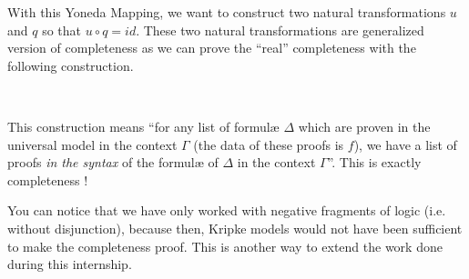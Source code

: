 \documentclass[10pt,a4paper]{article}
\begin{document}
			With this Yoneda Mapping, we want to construct two natural transformations $u$ and $q$ so that $u \circ q = id$. These two natural transformations are generalized version of completeness as we can prove the \enquote{real} completeness with the following construction.
			
			\begin{center}
			\begin{code}
				\>[4]\AgdaSpace{}%
				\AgdaSymbol{:}\AgdaSpace{}%
				\AgdaSymbol{\{}\AgdaSpace{}%
				\AgdaSpace{}%
				\AgdaSymbol{:}\AgdaSpace{}%
				\AgdaSymbol{\}}\AgdaSpace{}%
				\AgdaSpace{}%
				\AgdaSymbol{(\{}\AgdaSpace{}%
				\AgdaSymbol{:}\AgdaSpace{}%
				\AgdaSymbol{\}}\AgdaSpace{}%
				\AgdaSpace{}%
				\AgdaSpace{}%
				\AgdaSpace{}%
				\AgdaSpace{}%
				\AgdaSpace{}%
				\AgdaSpace{}%
				\AgdaSpace{}%
				\AgdaSpace{}%
				\AgdaSpace{}%
				\AgdaSpace{}%
				\AgdaSymbol{)}%
				\>[99]\AgdaSpace{}%
				\AgdaSpace{}%
				\AgdaSpace{}%
				\<%
				\\
				\>[4]\AgdaSpace{}%
				\AgdaSymbol{\{}\AgdaSymbol{\}}\AgdaSpace{}%
				\AgdaSymbol{\{}\AgdaSymbol{\}}\AgdaSpace{}%
				\AgdaSpace{}%
				\AgdaSymbol{=}\AgdaSpace{}%
				\AgdaSpace{}%
				\AgdaSpace{}%
				\AgdaSpace{}%
				\AgdaSymbol{(}\AgdaSpace{}%
				\AgdaSymbol{\{}\AgdaSymbol{\}}\AgdaSpace{}%
				\AgdaSymbol{(}\AgdaSpace{}%
				\AgdaSpace{}%
				\AgdaSpace{}%
				\AgdaSymbol{))}\<%
			\end{code}
			\end{center}
		
		This construction means \enquote{for any list of formulæ $\Delta$ which are proven in the universal model in the context $\Gamma$ (the data of these proofs is $f$), we have a list of proofs \emph{in the syntax} of the formulæ of $\Delta$ in the context $\Gamma$}. This is exactly completeness !
		
		You can notice that we have only worked with negative fragments of logic (i.e. without disjunction), because then, Kripke models would not have been sufficient to make the completeness proof. This is another way to extend the work done during this internship.
		
\end{document}
